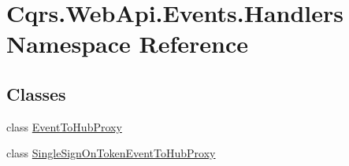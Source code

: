 \hypertarget{namespaceCqrs_1_1WebApi_1_1Events_1_1Handlers}{}\section{Cqrs.\+Web\+Api.\+Events.\+Handlers Namespace Reference}
\label{namespaceCqrs_1_1WebApi_1_1Events_1_1Handlers}
\subsection*{Classes}
\begin{DoxyCompactItemize}
\item 
class \hyperlink{classCqrs_1_1WebApi_1_1Events_1_1Handlers_1_1EventToHubProxy}{Event\+To\+Hub\+Proxy}
\item 
class \hyperlink{classCqrs_1_1WebApi_1_1Events_1_1Handlers_1_1SingleSignOnTokenEventToHubProxy}{Single\+Sign\+On\+Token\+Event\+To\+Hub\+Proxy}
\end{DoxyCompactItemize}
